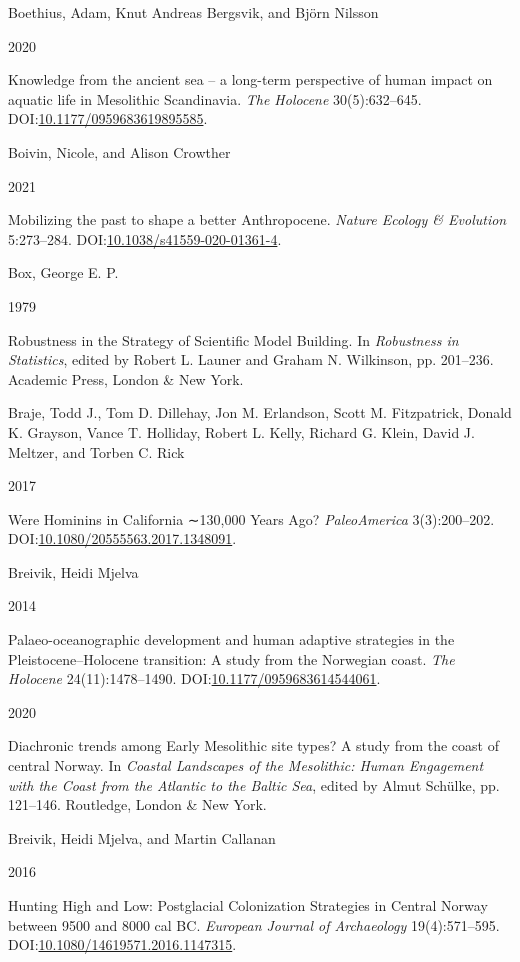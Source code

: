 \documentclass[
  12pt,
  a4paper,
  oneside]{book}
\newlength{\cslhangindent}
\newlength{\csllabelwidth}
\newlength{\cslentryspacingunit} %
\newenvironment{CSLReferences}[2] %
 {%
  \setlength{\parindent}{0pt}
  \ifodd #1
  \let\oldpar\par
  \def\par{\hangindent=\cslhangindent\oldpar}
  \fi
  \setlength{\parskip}{#2\cslentryspacingunit}
 }%
 {}
\newcommand{\CSLBlock}[1]{#1\hfill\break}
\newcommand{\CSLLeftMargin}[1]{\parbox[t]{\csllabelwidth}{#1}}
\newcommand{\CSLRightInline}[1]{\parbox[t]{\linewidth - \csllabelwidth}{#1}\break}
\begin{document}
\begin{CSLReferences}{0}{0}
\leavevmode{}%
\CSLBlock{Boethius, Adam, Knut Andreas Bergsvik, and Björn Nilsson}
\CSLLeftMargin{ 2020}
\CSLRightInline{{Knowledge from the ancient sea -- a long-term perspective of human impact on aquatic life in Mesolithic Scandinavia}. \emph{The Holocene} 30(5):632--645. DOI:\href{https://doi.org/10.1177/0959683619895585}{10.1177/0959683619895585}.}

\leavevmode{}%
\CSLBlock{Boivin, Nicole, and Alison Crowther}
\CSLLeftMargin{ 2021}
\CSLRightInline{Mobilizing the past to shape a better Anthropocene. \emph{Nature Ecology \& Evolution} 5:273--284. DOI:\href{https://doi.org/10.1038/s41559-020-01361-4}{10.1038/s41559-020-01361-4}.}

\leavevmode{}%
\CSLBlock{Box, George E. P.}
\CSLLeftMargin{ 1979}
\CSLRightInline{{Robustness in the Strategy of Scientific Model Building}. In \emph{{Robustness in Statistics}}, edited by Robert L. Launer and Graham N. Wilkinson, pp. 201--236. Academic Press, London \& New York.}

\leavevmode{}%
\CSLBlock{Braje, Todd J., Tom D. Dillehay, Jon M. Erlandson, Scott M. Fitzpatrick, Donald K. Grayson, Vance T. Holliday, Robert L. Kelly, Richard G. Klein, David J. Meltzer, and Torben C. Rick}
\CSLLeftMargin{ 2017}
\CSLRightInline{Were Hominins in California ∼130,000 Years Ago? \emph{PaleoAmerica} 3(3):200--202. DOI:\href{https://doi.org/10.1080/20555563.2017.1348091}{10.1080/20555563.2017.1348091}.}

\leavevmode{}%
\CSLBlock{Breivik, Heidi Mjelva}
\CSLLeftMargin{ 2014}
\CSLRightInline{Palaeo-oceanographic development and human adaptive strategies in the Pleistocene--Holocene transition: A study from the Norwegian coast. \emph{The Holocene} 24(11):1478--1490. DOI:\href{https://doi.org/10.1177/0959683614544061}{10.1177/0959683614544061}.}

\leavevmode{}%
\CSLLeftMargin{ 2020 }
\CSLRightInline{{Diachronic trends among Early Mesolithic site types? A study from the coast of central Norway}. In \emph{{Coastal Landscapes of the Mesolithic: Human Engagement with the Coast from the Atlantic to the Baltic Sea}}, edited by Almut Schülke, pp. 121--146. Routledge, London \& New York.}

\leavevmode{}%
\CSLBlock{Breivik, Heidi Mjelva, and Martin Callanan}
\CSLLeftMargin{ 2016}
\CSLRightInline{{Hunting High and Low: Postglacial Colonization Strategies in Central Norway between 9500 and 8000 cal BC}. \emph{European Journal of Archaeology} 19(4):571--595. DOI:\href{https://doi.org/10.1080/14619571.2016.1147315}{10.1080/14619571.2016.1147315}.}


\end{CSLReferences}
\end{document}
